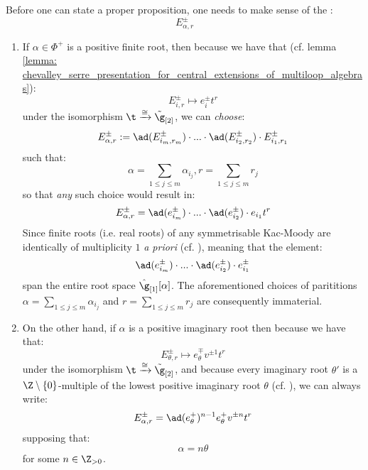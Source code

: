         \begin{remark} \label{remark: root_vectors_for_toroidal_lie_algebras}
            Before one can state a proper proposition, one needs to make sense of the :
                $$E_{\alpha, r}^{\pm}$$
            \begin{enumerate}
                \item If $\alpha \in \Phi^+$ is a positive finite root, then because we have that (cf. lemma \ref{lemma: chevalley_serre_presentation_for_central_extensions_of_multiloop_algebras}):
                    $$E_{i, r}^{\pm} \mapsto e_i^{\pm} t^r$$
                under the isomorphism $\t \xrightarrow[]{\cong} \tilde{\g}_{[2]}$, we can \textit{choose}:
                    $$E_{\alpha, r}^{\pm} := \ad(E_{i_m, r_m}^{\pm}) \cdot ... \cdot \ad(E_{i_2, r_2}^{\pm}) \cdot E_{i_1, r_1}^{\pm}$$
                such that:
                    $$\alpha = \sum_{1 \leq j \leq m} \alpha_{i_j}, r = \sum_{1 \leq j \leq m} r_j$$
                so that \textit{any} such choice would result in:
                    $$E_{\alpha, r}^{\pm} = \ad(e_{i_m}^{\pm}) \cdot ... \cdot \ad(e_{i_2}^{\pm}) \cdot e_{i_1} t^r$$
                Since finite roots (i.e. real roots) of any symmetrisable Kac-Moody are identically of multiplicity $1$ \textit{a priori} (cf. \cite[Chapter 4]{kac_infinite_dimensional_lie_algebras}), meaning that the element:
                    $$\ad(e_{i_m}^{\pm}) \cdot ... \cdot \ad(e_{i_2}^{\pm}) \cdot e_{i_1}^{\pm}$$
                span the entire root space $\hat{\g}_{[1]}[\alpha]$. The aforementioned choices of parititions $\alpha = \sum_{1 \leq j \leq m} \alpha_{i_j}$ and $r = \sum_{1 \leq j \leq m} r_j$ are consequently immaterial.
                
                \item On the other hand, if $\alpha$ is a positive imaginary root then because we have that:
                    $$E_{\theta, r}^{\pm} \mapsto e_{\theta}^{\mp} v^{\pm 1} t^r$$
                under the isomorphism $\t \xrightarrow[]{\cong} \tilde{\g}_{[2]}$, and because every imaginary root $\theta'$ is a $\Z \setminus \{0\}$-multiple of the lowest positive imaginary root $\theta$ (cf. \cite[Chapter 6]{kac_infinite_dimensional_lie_algebras}), we can always write:
                    $$E_{\alpha, r}^{\pm} = \ad(e_{\theta}^+)^{n - 1} e_{\theta}^+ v^{\pm n} t^r$$
                supposing that:
                    $$\alpha = n \theta$$
                for some $n \in \Z_{> 0}$.
            \end{enumerate}
        \end{remark}
